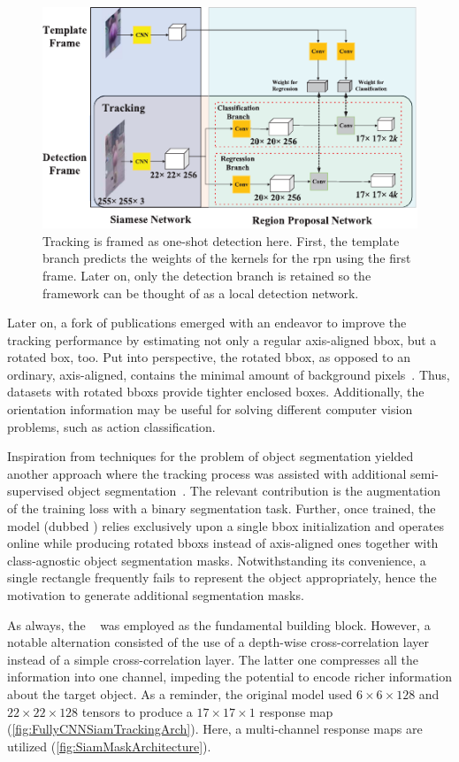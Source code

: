 \begin{figure}[t]
    \centerline{\includegraphics[width=0.7\linewidth]{figures/theoretical_foundations/siam_rpn_one_shot_detection.pdf}}
    \caption[Tracking as one-shot detection]{Tracking is framed as one-shot detection here. First, the template branch predicts the weights of the kernels for the \gls{rpn} using the first frame. Later on, only the detection branch is retained so the framework can be thought of as a local detection network. }
    \label{fig:SiamRPNOneShotDetection}
\end{figure}

Later on, a fork of publications emerged with an endeavor to improve the tracking performance by estimating not only a regular axis-aligned \gls{bbox}, but a rotated box, too. Put into perspective, the rotated \gls{bbox}, as opposed to an ordinary, axis-aligned, contains the minimal amount of background pixels~\cite{Chen2019}. Thus, datasets with rotated \glspl{bbox} provide tighter enclosed boxes. Additionally, the orientation information may be useful for solving different computer vision problems, such as action classification.

Inspiration from techniques for the problem of object segmentation yielded another approach where the tracking process was assisted with additional semi-supervised object segmentation~\cite{Wang2019}. The relevant contribution is the augmentation of the training loss with a binary segmentation task. Further, once trained, the model (dubbed ) relies exclusively upon a single \gls{bbox} initialization and operates online while producing rotated \glspl{bbox} instead of axis-aligned ones together with class-agnostic object segmentation masks. Notwithstanding its convenience, a single rectangle frequently fails to represent the object appropriately, hence the motivation to generate additional segmentation masks.

As always, the ~\cite{Bertinetto2016} was employed as the fundamental building block. However, a notable alternation consisted of the use of a depth-wise cross-correlation layer instead of a simple cross-correlation layer. The latter one compresses all the information into one channel, impeding the potential to encode richer information about the target object. As a reminder, the original model used $6 \times 6 \times 128$ and $22 \times 22 \times 128$ tensors to produce a $17 \times 17 \times 1$ response map (\cref{fig:FullyCNNSiamTrackingArch}). Here, a multi-channel response maps are utilized (\cref{fig:SiamMaskArchitecture}).

